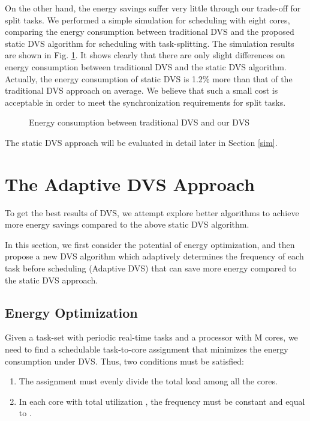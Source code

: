 \documentclass[12pt, journal,compsoc]{IEEEtran}
\begin{document}
On the other hand, the energy savings suffer very little through our trade-off for split tasks. We performed a simple simulation for scheduling with eight cores, comparing the energy consumption between traditional DVS and the proposed static DVS algorithm for scheduling with task-splitting. The simulation results are shown in Fig. \ref{TDOD}. It shows clearly that there are only slight differences on energy consumption between traditional DVS and the static DVS algorithm. Actually, the energy consumption of static DVS is 1.2\% more than that of the traditional DVS approach on average. We believe that such a small cost is acceptable in order to meet the synchronization requirements for split tasks.


\begin{figure}[!t]
\centering
{}
\hspace{-0.2in}
\caption{Energy consumption between traditional DVS and our DVS}
\label{TDOD}
\end{figure}

The static DVS approach will be evaluated in detail later in Section \ref{sim}.


\section{The Adaptive DVS Approach}
\label{pre}

To get the best results of DVS, we attempt explore better algorithms to achieve more energy savings compared to the above static DVS algorithm.

In this section, we first consider the potential of energy optimization, and then propose a new DVS algorithm which adaptively determines the frequency of each task before scheduling (Adaptive DVS) that can save more energy compared to the static DVS approach.

\subsection{Energy Optimization}

Given a task-set with periodic real-time tasks and a processor with M cores, we need to find a schedulable task-to-core assignment that minimizes the energy consumption under DVS. Thus, two conditions \cite{Aydin:2003:EPM:838237.838347} must be satisfied:

\begin{enumerate}
\item The assignment must evenly divide the total load  among all the cores.
\item In each core with total utilization , the frequency  must be constant and equal to .
\end{enumerate}
\end{document}
